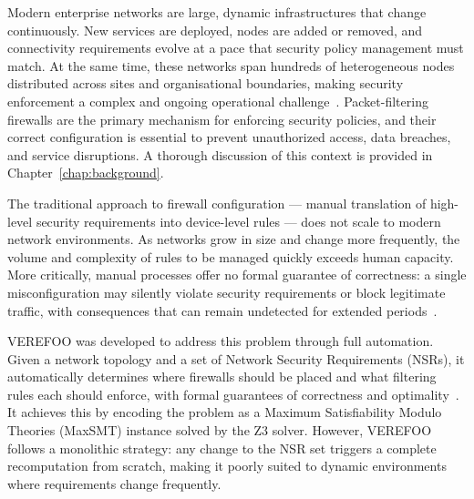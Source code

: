 



Modern enterprise networks are large, dynamic infrastructures that change continuously. New services are deployed, nodes are added or removed, and connectivity requirements evolve at a pace that security policy management must match. At the same time, these networks span hundreds of heterogeneous nodes distributed across sites and organisational boundaries, making security enforcement a complex and ongoing operational challenge~\cite{automation-survey}. Packet-filtering firewalls are the primary mechanism for enforcing security policies, and their correct configuration is essential to prevent unauthorized access, data breaches, and service disruptions. A thorough discussion of this context is provided in Chapter~\ref{chap:background}.

The traditional approach to firewall configuration — manual translation of high-level security requirements into device-level rules — does not scale to modern network environments. As networks grow in size and change more frequently, the volume and complexity of rules to be managed quickly exceeds human capacity. More critically, manual processes offer no formal guarantee of correctness: a single misconfiguration may silently violate security requirements or block legitimate traffic, with consequences that can remain undetected for extended periods~\cite{atomizing}.

VEREFOO was developed to address this problem through full automation. Given a network topology and a set of Network Security Requirements (NSRs), it automatically determines where firewalls should be placed and what filtering rules each should enforce, with formal guarantees of correctness and optimality~\cite{verefoo}. It achieves this by encoding the problem as a Maximum Satisfiability Modulo Theories (MaxSMT) instance solved by the Z3 solver. However, VEREFOO follows a monolithic strategy: any change to the NSR set triggers a complete recomputation from scratch, making it poorly suited to dynamic environments where requirements change frequently.

